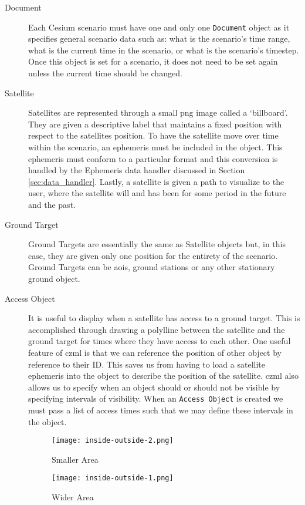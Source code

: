 \begin{description} 

    \item[Document] Each Cesium scenario must have one and only one
	\texttt{Document} object as it specifies general scenario data such as:
	what is the scenario's time range, what is the current time in the
	scenario, or what is the scenario's timestep. Once this object is set
	for a scenario, it does not need to be set again unless the current
	time should be changed.

    \item[Satellite] Satellites are represented through a small \gls{png} image
	called a `billboard'. They are given a descriptive label that maintains
	a fixed position with respect to the satellites position. To have the
	satellite move over time within the scenario, an ephemeris must be
	included in the object. This ephemeris must conform to a particular
	format and this conversion is handled by the Ephemeris data handler
	discussed in Section \ref{sec:data_handler}. Lastly, a satellite is
	given a path to visualize to the user, where the satellite will and has
	been for some period in the future and the past.

    \item[Ground Target] Ground Targets are essentially the same as Satellite
	objects but, in this case, they are given only one position for the
	entirety of the scenario. Ground Targets can be \glspl{aoi}, ground
	stations or any other stationary ground object.

    \item[Access Object] It is useful to display when a satellite has access to
	a ground target. This is accomplished through drawing a polylline
	between the satellite and the ground target for times where they have
	access to each other. One useful feature of \gls{czml} is that we can
	reference the position of other object by reference to their ID. This
	saves us from having to load a satellite ephemeris into the object to
	describe the position of the satellite. \gls{czml} also allows us to
	specify when an object should or should not be visible by specifying
	intervals of visibility. When an \texttt{Access Object} is created we
	must pass a list of access times such that we may define these
	intervals in the object.

\begin{figure}
    \begin{minipage}[c]{0.45\textwidth}
	\centering
	\texttt{[image: inside-outside-2.png]} 
	\caption{Smaller Area}
	\label{fig:inside_polygon_1}
    \end{minipage}
    \hfill
    \begin{minipage}[c]{0.45\textwidth}
	\centering
	\texttt{[image: inside-outside-1.png]} 
	\caption{Wider Area}
	\label{fig:inside_polygon_2}
    \end{minipage} 
\end{figure}



\end{description}
